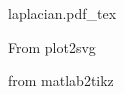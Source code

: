 \documentclass{article}
\newcommand{\incfig}[2][1]{%
    \def\svgwidth{#1\columnwidth}
    {#2.pdf_tex}
}
\newcommand{\texdim}[2]{%
	\newlength\fheight
	\newlength\fwidth
    \setlength\fheight{#1}
    \setlength\fwidth{#2}
}
\begin{document}
    \begin{figure}[h]\centering
        \incfig{laplacian}
        \caption{From plot2svg}
    \end{figure}
    
    \begin{figure}[h]
        \texdim{8cm}{12cm}
        
        \caption{from matlab2tikz}
    \end{figure}
\end{document}
